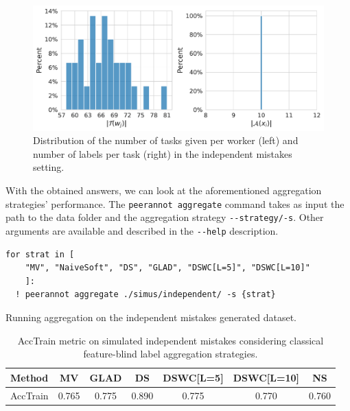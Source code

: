 \begin{figure}[tbh]
    \centering
    \includegraphics[width=\textwidth]{./images_peerannot/fig-simu1-output-1.pdf}
    \caption{Distribution of the number of tasks given per worker (left) and number of labels per task (right) in the independent mistakes setting.}
    \label{fig:desc_independent}
\end{figure}

With the obtained answers, we can look at the aforementioned aggregation strategies' performance. The \texttt{peerannot aggregate} command takes as input the path to the data folder and the aggregation strategy \texttt{-{}-strategy/-s}. Other arguments are available and described in the \texttt{-{}-help} description.

\begin{listing}[H]
    \begin{verbatim}
for strat in [
    "MV", "NaiveSoft", "DS", "GLAD", "DSWC[L=5]", "DSWC[L=10]"
    ]:
  ! peerannot aggregate ./simus/independent/ -s {strat}
    \end{verbatim}
    \caption{Running aggregation on the independent mistakes generated dataset.}
    \label{lst:indep_mistakes_agg}
\end{listing}

\begin{table}[htbp]
    \centering
    \caption{AccTrain metric on simulated independent mistakes considering classical feature-blind label aggregation strategies.}
    \label{tab:accuracy_train_indep}
    \begin{tabular}{|l|c|c|c|c|c|c|}
    \hline
    \textbf{Method} & \textbf{MV} & \textbf{GLAD} & \textbf{DS} & \textbf{DSWC[L=5]} & \textbf{DSWC[L=10]} & \textbf{NS} \\
    \hline
    AccTrain & 0.765 & 0.775 & 0.890 & 0.775 & 0.770 & 0.760 \\
    \hline
    \end{tabular}
    \end{table}


